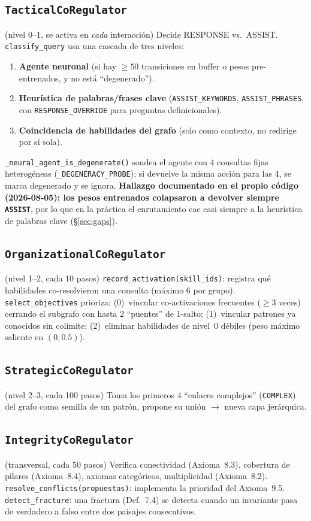 \documentclass[11pt,a4paper]{report}
\newcommand{\code}[1]{\texttt{#1}}
\begin{document}
\subsection{\code{TacticalCoRegulator}} (nivel 0--1, se activa en \emph{cada} interacci\'on)
Decide RESPONSE vs.\ ASSIST. \code{classify_query} usa una cascada de tres niveles:
\begin{enumerate}
  \item \textbf{Agente neuronal} (si hay $\ge50$ transiciones en buffer o pesos pre-entrenados, y no est\'a ``degenerado'').
  \item \textbf{Heur\'istica de palabras/frases clave} (\code{ASSIST_KEYWORDS}, \code{ASSIST_PHRASES}, con \code{RESPONSE_OVERRIDE} para preguntas definicionales).
  \item \textbf{Coincidencia de habilidades del grafo} (solo como contexto, no redirige por s\'i sola).
\end{enumerate}
\code{\_neural_agent_is_degenerate()} sondea el agente con 4 consultas fijas heterog\'eneas (\code{\_DEGENERACY_PROBE}); si devuelve la misma acci\'on para las 4, se marca degenerado y se ignora. \textbf{Hallazgo documentado en el propio c\'odigo (2026-08-05): los pesos entrenados colapsaron a devolver siempre \code{ASSIST}}, por lo que en la pr\'actica el enrutamiento cae casi siempre a la heur\'istica de palabras clave (\S\ref{sec:gaps}).

\subsection{\code{OrganizationalCoRegulator}} (nivel 1--2, cada 10 pasos)
\code{record_activation(skill_ids)}: registra qu\'e habilidades co-resolvieron una consulta (m\'aximo 6 por grupo). \code{select_objectives} prioriza: (0)~vincular co-activaciones frecuentes ($\ge3$ veces) cerrando el subgrafo con hasta 2 ``puentes'' de 1-salto; (1)~vincular patrones ya conocidos sin colimite; (2)~eliminar habilidades de nivel~0 d\'ebiles (peso m\'aximo saliente en $(0,0.5)$).

\subsection{\code{StrategicCoRegulator}} (nivel 2--3, cada 100 pasos)
Toma los primeros 4 ``enlaces complejos'' (\code{COMPLEX}) del grafo como semilla de un patr\'on, propone su uni\'on $\to$ nueva capa jer\'arquica.

\subsection{\code{IntegrityCoRegulator}} (transversal, cada 50 pasos)
Verifica conectividad (Axioma~8.3), cobertura de pilares (Axioma~8.4), axiomas categ\'oricos, multiplicidad (Axioma~8.2). \code{resolve_conflicts(propuestas)}: implementa la prioridad del Axioma~9.5. \code{detect_fracture}: una fractura (Def.~7.4) se detecta cuando un invariante pasa de verdadero a falso entre dos paisajes consecutivos.
\end{document}
